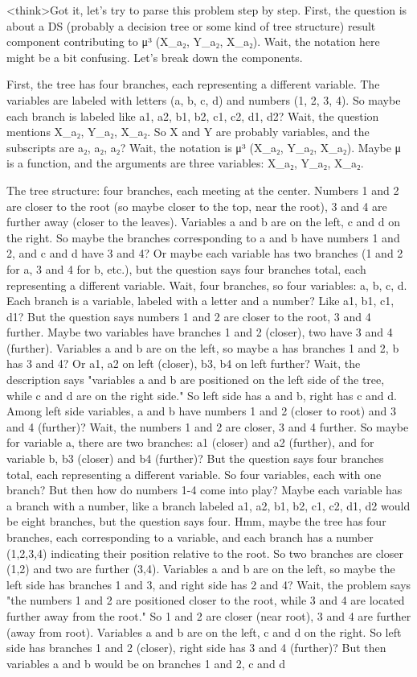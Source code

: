 <think>Got it, let's try to parse this problem step by step. First, the question is about a DS (probably a decision tree or some kind of tree structure) result component contributing to μ³ (X_a₂, Y_a₂, X_a₂). Wait, the notation here might be a bit confusing. Let's break down the components.

First, the tree has four branches, each representing a different variable. The variables are labeled with letters (a, b, c, d) and numbers (1, 2, 3, 4). So maybe each branch is labeled like a1, a2, b1, b2, c1, c2, d1, d2? Wait, the question mentions X_a₂, Y_a₂, X_a₂. So X and Y are probably variables, and the subscripts are a₂, a₂, a₂? Wait, the notation is μ³ (X_a₂, Y_a₂, X_a₂). Maybe μ is a function, and the arguments are three variables: X_a₂, Y_a₂, X_a₂. 

The tree structure: four branches, each meeting at the center. Numbers 1 and 2 are closer to the root (so maybe closer to the top, near the root), 3 and 4 are further away (closer to the leaves). Variables a and b are on the left, c and d on the right. So maybe the branches corresponding to a and b have numbers 1 and 2, and c and d have 3 and 4? Or maybe each variable has two branches (1 and 2 for a, 3 and 4 for b, etc.), but the question says four branches total, each representing a different variable. Wait, four branches, so four variables: a, b, c, d. Each branch is a variable, labeled with a letter and a number? Like a1, b1, c1, d1? But the question says numbers 1 and 2 are closer to the root, 3 and 4 further. Maybe two variables have branches 1 and 2 (closer), two have 3 and 4 (further). Variables a and b are on the left, so maybe a has branches 1 and 2, b has 3 and 4? Or a1, a2 on left (closer), b3, b4 on left further? Wait, the description says "variables a and b are positioned on the left side of the tree, while c and d are on the right side." So left side has a and b, right has c and d. Among left side variables, a and b have numbers 1 and 2 (closer to root) and 3 and 4 (further)? Wait, the numbers 1 and 2 are closer, 3 and 4 further. So maybe for variable a, there are two branches: a1 (closer) and a2 (further), and for variable b, b3 (closer) and b4 (further)? But the question says four branches total, each representing a different variable. So four variables, each with one branch? But then how do numbers 1-4 come into play? Maybe each variable has a branch with a number, like a branch labeled a1, a2, b1, b2, c1, c2, d1, d2 would be eight branches, but the question says four. Hmm, maybe the tree has four branches, each corresponding to a variable, and each branch has a number (1,2,3,4) indicating their position relative to the root. So two branches are closer (1,2) and two are further (3,4). Variables a and b are on the left, so maybe the left side has branches 1 and 3, and right side has 2 and 4? Wait, the problem says "the numbers 1 and 2 are positioned closer to the root, while 3 and 4 are located further away from the root." So 1 and 2 are closer (near root), 3 and 4 are further (away from root). Variables a and b are on the left, c and d on the right. So left side has branches 1 and 2 (closer), right side has 3 and 4 (further)? But then variables a and b would be on branches 1 and 2, c and d 